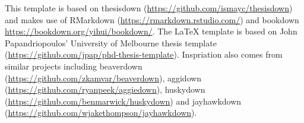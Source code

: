 \documentclass[11pt,a4paper,titlepage,twoside,openright]{style/unimelbthesis}
\theoremstyle{definition}
\theoremstyle{definition}
\theoremstyle{definition}
\theoremstyle{remark}
\begin{document}
\begin{frontmatter}
  \begin{acknowledgements}
    This template is based on thesisdown (\url{https://github.com/ismayc/thesisdown}) and makes use of RMarkdown (\url{https://rmarkdown.rstudio.com/}) and bookdown \url{https://bookdown.org/yihui/bookdown/}. The LaTeX template is based on John Papandriopoulos' University of Melbourne thesis template (\url{https://github.com/jpap/phd-thesis-template}). Inspriation also comes from similar projects including beaverdown (\url{https://github.com/zkamvar/beaverdown}), aggidown (\url{https://github.com/ryanpeek/aggiedown}), huskydown (\url{https://github.com/benmarwick/huskydown}) and jayhawkdown (\url{https://github.com/wjakethompson/jayhawkdown}).
  \end{acknowledgements}


  \hypersetup{linkcolor=black}
  \setcounter{tocdepth}{2}
  \tableofcontents


  \listoftables


  \listoffigures



\end{frontmatter}

%
\end{document}

